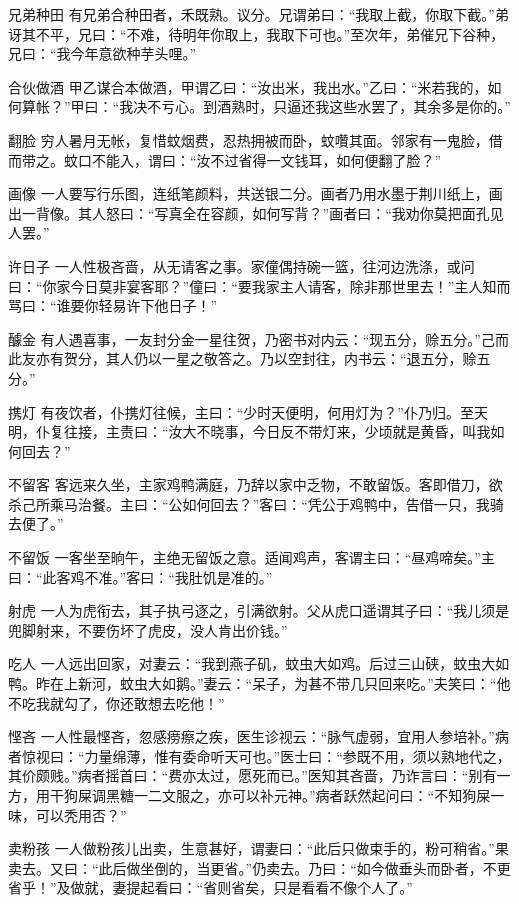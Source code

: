 \documentclass[12pt,UTF8]{ctexbook}
\begin{document}
兄弟种田
有兄弟合种田者，禾既熟。议分。兄谓弟曰：“我取上截，你取下截。”弟讶其不平，兄曰：“不难，待明年你取上，我取下可也。”至次年，弟催兄下谷种，兄曰：“我今年意欲种芋头哩。”

合伙做酒
甲乙谋合本做酒，甲谓乙曰：“汝出米，我出水。”乙曰：“米若我的，如何算帐？”甲曰：“我决不亏心。到酒熟时，只逼还我这些水罢了，其余多是你的。”

翻脸
穷人暑月无帐，复惜蚊烟费，忍热拥被而卧，蚊囋其面。邻家有一鬼脸，借而带之。蚊口不能入，谓曰：“汝不过省得一文钱耳，如何便翻了脸？”

画像
一人要写行乐图，连纸笔颜料，共送银二分。画者乃用水墨于荆川纸上，画出一背像。其人怒曰：“写真全在容颜，如何写背？”画者曰：“我劝你莫把面孔见人罢。”

许日子
一人性极吝啬，从无请客之事。家僮偶持碗一篮，往河边洗涤，或问曰：“你家今日莫非宴客耶？”僮曰：“要我家主人请客，除非那世里去！”主人知而骂曰：“谁要你轻易许下他日子！”

醵金
有人遇喜事，一友封分金一星往贺，乃密书对内云：“现五分，赊五分。”己而此友亦有贺分，其人仍以一星之敬答之。乃以空封往，内书云：“退五分，赊五分。”

携灯
有夜饮者，仆携灯往候，主曰：“少时天便明，何用灯为？”仆乃归。至天明，仆复往接，主责曰：“汝大不晓事，今日反不带灯来，少顷就是黄昏，叫我如何回去？”

不留客
客远来久坐，主家鸡鸭满庭，乃辞以家中乏物，不敢留饭。客即借刀，欲杀己所乘马治餐。主曰：“公如何回去？”客曰：“凭公于鸡鸭中，告借一只，我骑去便了。”

不留饭
一客坐至晌午，主绝无留饭之意。适闻鸡声，客谓主曰：“昼鸡啼矣。”主曰：“此客鸡不准。”客曰：“我肚饥是准的。”

射虎
一人为虎衔去，其子执弓逐之，引满欲射。父从虎口遥谓其子曰：“我儿须是兜脚射来，不要伤坏了虎皮，没人肯出价钱。”

吃人
一人远出回家，对妻云：“我到燕子矶，蚊虫大如鸡。后过三山硖，蚊虫大如鸭。昨在上新河，蚊虫大如鹅。”妻云：“呆子，为甚不带几只回来吃。”夫笑曰：“他不吃我就勾了，你还敢想去吃他！”

悭吝
一人性最悭吝，忽感痨瘵之疾，医生诊视云：“脉气虚弱，宜用人参培补。”病者惊视曰：“力量绵薄，惟有委命听天可也。”医士曰：“参既不用，须以熟地代之，其价颇贱。”病者摇首曰：“费亦太过，愿死而已。”医知其吝啬，乃诈言曰：“别有一方，用干狗屎调黑糖一二文服之，亦可以补元神。”病者跃然起问曰：“不知狗屎一味，可以秃用否？”

卖粉孩
一人做粉孩儿出卖，生意甚好，谓妻曰：“此后只做束手的，粉可稍省。”果卖去。又曰：“此后做坐倒的，当更省。”仍卖去。乃曰：“如今做垂头而卧者，不更省乎！”及做就，妻提起看曰：“省则省矣，只是看看不像个人了。”
\end{document}
